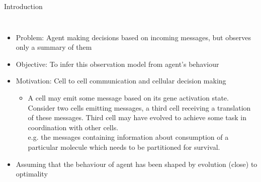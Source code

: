 \documentclass[
	english,%
	aspectratio=169,%
	color={accentcolor=3b},
	logo=true,%
	colorframetitle=false,%
	]{tudabeamer}
\begin{document}
\begin{frame}{Introduction}
\begin{columns}[onlytextwidth,c]
	\begin{itemize}
		\item Problem: Agent making decisions based on incoming messages, but observes only a summary of them
		\item Objective: To infer this observation model from agent's behaviour
		\item Motivation: Cell to cell communication and cellular decision making \cite{Perkins2009a}
		\begin{itemize}
			\item A cell may emit some message based on its gene activation state. Consider two cells emitting messages, a third cell receiving a translation of these messages. Third cell may have evolved to achieve some task in coordination with other cells.\\
			e.g. the messages containing information about consumption of a particular molecule which needs to be partitioned for survival.
		\end{itemize}
		\item Assuming that the behaviour of agent has been shaped by evolution (close) to optimality
	\end{itemize}
		\centering
\end{columns}
\end{frame}
\end{document}

